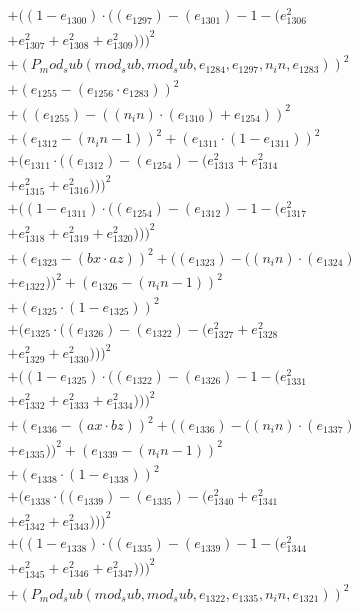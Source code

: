 \documentclass[10pt, a4paper]{article}
\begin{document}
\begin{small}
\begin{align*}
& + ((1 - e_{1300})  \cdot  ((e_{1297}) - (e_{1301}) - 1 - (e_{1306}^{2} \\
& + e_{1307}^{2} + e_{1308}^{2} + e_{1309}^{2})))^{2} \\
& + (P_mod_sub(mod_sub, mod_sub, e_{1284}, e_{1297}, n_in, e_{1283}))^{2} \\
& + (e_{1255} - (e_{1256}  \cdot  e_{1283}))^{2} \\
& + ((e_{1255}) - ((n_in)  \cdot  (e_{1310}) + e_{1254}))^{2} \\
& + (e_{1312} - (n_in - 1))^{2} + (e_{1311}  \cdot  (1 - e_{1311}))^{2} \\
& + (e_{1311}  \cdot  ((e_{1312}) - (e_{1254}) - (e_{1313}^{2} + e_{1314}^{2} \\
& + e_{1315}^{2} + e_{1316}^{2})))^{2} \\
& + ((1 - e_{1311})  \cdot  ((e_{1254}) - (e_{1312}) - 1 - (e_{1317}^{2} \\
& + e_{1318}^{2} + e_{1319}^{2} + e_{1320}^{2})))^{2} \\
& + (e_{1323} - (bx  \cdot  az))^{2} + ((e_{1323}) - ((n_in)  \cdot  (e_{1324}) \\
& + e_{1322}))^{2} + (e_{1326} - (n_in - 1))^{2} \\
& + (e_{1325}  \cdot  (1 - e_{1325}))^{2} \\
& + (e_{1325}  \cdot  ((e_{1326}) - (e_{1322}) - (e_{1327}^{2} + e_{1328}^{2} \\
& + e_{1329}^{2} + e_{1330}^{2})))^{2} \\
& + ((1 - e_{1325})  \cdot  ((e_{1322}) - (e_{1326}) - 1 - (e_{1331}^{2} \\
& + e_{1332}^{2} + e_{1333}^{2} + e_{1334}^{2})))^{2} \\
& + (e_{1336} - (ax  \cdot  bz))^{2} + ((e_{1336}) - ((n_in)  \cdot  (e_{1337}) \\
& + e_{1335}))^{2} + (e_{1339} - (n_in - 1))^{2} \\
& + (e_{1338}  \cdot  (1 - e_{1338}))^{2} \\
& + (e_{1338}  \cdot  ((e_{1339}) - (e_{1335}) - (e_{1340}^{2} + e_{1341}^{2} \\
& + e_{1342}^{2} + e_{1343}^{2})))^{2} \\
& + ((1 - e_{1338})  \cdot  ((e_{1335}) - (e_{1339}) - 1 - (e_{1344}^{2} \\
& + e_{1345}^{2} + e_{1346}^{2} + e_{1347}^{2})))^{2} \\
& + (P_mod_sub(mod_sub, mod_sub, e_{1322}, e_{1335}, n_in, e_{1321}))^{2} \\

\end{align*}
\end{small}
\end{document}

